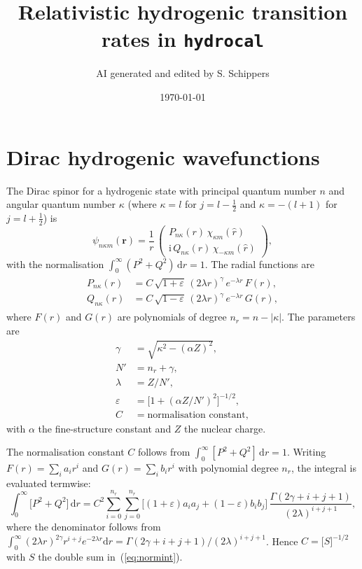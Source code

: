 \documentclass[11pt,a4paper]{article}
\title{Relativistic hydrogenic transition rates in {\tt hydrocal}}
\author{AI generated and edited by S. Schippers}
\date{\today}
\newcommand{\dif}{\mathrm{d}}
\newcommand{\iu}{\mathrm{i}}
\renewcommand{\vec}[1]{\bm{#1}}
\begin{document}
\maketitle

\section{Dirac hydrogenic wavefunctions}

The Dirac spinor for a hydrogenic state with principal quantum number $n$ and
angular quantum number $\kappa$ (where $\kappa = l$ for $j=l-\tfrac12$ and
$\kappa = -(l+1)$ for $j = l+\tfrac12$) is
\begin{equation}
  \psi_{n\kappa m}(\vec{r}) =
  \frac{1}{r}\,
  \begin{pmatrix}
    P_{n\kappa}(r)\,\chi_{\kappa m}(\hat{r})\\[2pt]
    \iu\,Q_{n\kappa}(r)\,\chi_{-\kappa m}(\hat{r})
  \end{pmatrix},
\end{equation}
with the normalisation $\int_{0}^{\infty}(P^{2}+Q^{2})\,\dif r = 1$.
The radial functions are
\begin{align}
  \begin{split}
  P_{n\kappa}(r) &= C\,\sqrt{1+\varepsilon}\,
                  (2\lambda r)^{\gamma}\,e^{-\lambda r}\,F(r),\\
  Q_{n\kappa}(r) &= C\,\sqrt{1-\varepsilon}\,
                  (2\lambda r)^{\gamma}\,e^{-\lambda r}\,G(r),
  \end{split}
\end{align}
where $F(r)$ and $G(r)$ are polynomials of degree $n_{r}=n-|\kappa|$.
The parameters are
\begin{align}
  \gamma &= \sqrt{\kappa^{2}-(\alpha Z)^{2}},\\
  N' &= n_{r}+\gamma,\\
  \lambda &= Z/N',\\
  \varepsilon &= \bigl[1+(\alpha Z/N')^{2}\bigr]^{-1/2},\\
  C &= \text{normalisation constant},
\end{align}
with $\alpha$ the fine-structure constant and $Z$ the nuclear charge.

The normalisation constant $C$ follows from
$\int_{0}^{\infty}[P^{2}+Q^{2}]\,\dif r = 1$.  Writing
$F(r)=\sum_{i}a_{i}r^{i}$ and $G(r)=\sum_{i}b_{i}r^{i}$ with
polynomial degree $n_{r}$, the integral is evaluated termwise:
\begin{equation}
  \int_{0}^{\infty}\!\bigl[P^{2}+Q^{2}\bigr]\,\dif r
  = C^{2}\sum_{i=0}^{n_{r}}\sum_{j=0}^{n_{r}}
    \bigl[(1+\varepsilon)a_{i}a_{j}+(1-\varepsilon)b_{i}b_{j}\bigr]\,
    \frac{\Gamma(2\gamma+i+j+1)}{(2\lambda)^{i+j+1}},
  \label{eq:normint}
\end{equation}
where the denominator follows from
$\int_{0}^{\infty}(2\lambda r)^{2\gamma}r^{i+j}e^{-2\lambda r}\dif r
= \Gamma(2\gamma+i+j+1)/(2\lambda)^{i+j+1}$.
Hence $C = \bigl[S\bigr]^{-1/2}$ with $S$ the double sum in~(\ref{eq:normint}).
\end{document}
